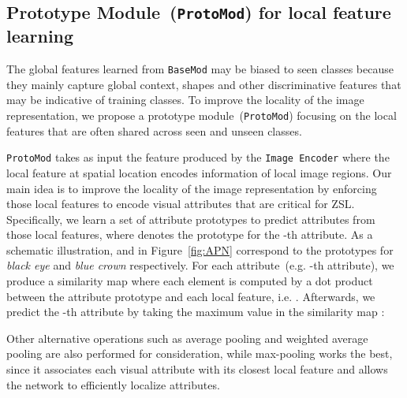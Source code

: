 \subsection{Prototype Module~(\texttt{ProtoMod}) for local feature learning}

The global features learned from \texttt{BaseMod} may be biased to seen classes because they mainly capture global context, shapes and other discriminative features that may be indicative of training classes. To improve the locality of the image representation, we propose a prototype module~(\texttt{ProtoMod}) focusing on the local features that are often shared across seen and unseen classes.


\begin{comment}
\myparagraph{Attribute prototypes.} \texttt{ProtoMod} takes as input  coming from the \texttt{Image Encoder} composed by the local features  that encode the information of local image regions where local attributes and object parts appear.
We learn a set of attribute prototypes  to predict attributes from those local features, where  denotes the prototype for the -th attribute.
As a schematic illustration,  and  in Figure~\ref{fig:APN} correspond to the prototypes for \textit{black eye} and \textit{blue crown} respectively. For each attribute~(e.g. -th attribute), we compute a similarity map  that measures the compatibility between its prototype  and all the local features, where each element of  is computed by . Afterwards, we predict the -th attribute  by taking the maximum value in the similarity map :
\end{comment}

 \texttt{ProtoMod} takes as input the feature  produced by the \texttt{Image Encoder} where the local feature  at spatial location  encodes information of local image regions. Our main idea is to improve the locality of the image representation by enforcing those local features to encode visual attributes that are critical for ZSL.
Specifically, we learn a set of attribute prototypes  to predict attributes from those local features, where  denotes the prototype for the -th attribute. As a schematic illustration,  and  in Figure~\ref{fig:APN} correspond to the prototypes for \textit{black eye} and \textit{blue crown} respectively. For each attribute~(e.g. -th attribute), we produce a similarity map  where each element is computed by a dot product between the attribute prototype  and each local feature, i.e. . 
Afterwards, we predict the -th attribute  by taking the maximum value in the similarity map :
\begin{linenomath*}
    
\end{linenomath*}
Other alternative operations such as average pooling and weighted average pooling are also performed for consideration, while max-pooling works the best, since it associates each visual attribute with its closest local feature and allows the network to efficiently localize attributes.



